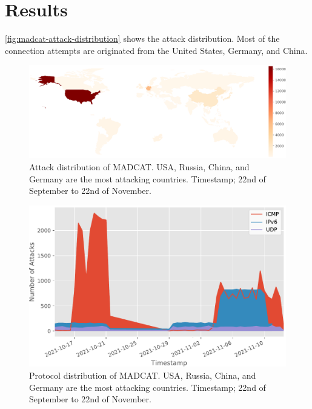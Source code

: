 \section{Results} %

\autoref{fig:madcat-attack-distribution} shows the attack distribution.
Most of the connection attempts are originated from the United States, Germany, and China.

\begin{figure}[ht]
    \centering
    \includegraphics[width=\textwidth]{figures/madcat-overview-map.pdf}
    \caption[Attack distribution of MADCAT]{Attack distribution of MADCAT. USA, Russia, China, and Germany are the most attacking countries. Timestamp; 22nd of September to 22nd of November.}
    \label{fig:madcat-attack-distribution}
\end{figure}

\begin{figure}[ht]
    \centering
    \includegraphics[width=\textwidth]{figures/madcat-protocol-usage.pdf}
    \caption[Protocol distribution of MADCAT]{Protocol distribution of MADCAT. USA, Russia, China, and Germany are the most attacking countries. Timestamp; 22nd of September to 22nd of November.}
    \label{fig:madcat-protocols}
\end{figure}
